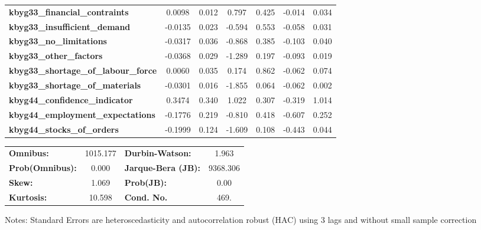 \begin{center}
\begin{tabular}{lcccccc}
\textbf{kbyg33\_financial\_contraints}       &       0.0098  &        0.012     &     0.797  &         0.425        &       -0.014    &        0.034     \\
\textbf{kbyg33\_insufficient\_demand}        &      -0.0135  &        0.023     &    -0.594  &         0.553        &       -0.058    &        0.031     \\
\textbf{kbyg33\_no\_limitations}             &      -0.0317  &        0.036     &    -0.868  &         0.385        &       -0.103    &        0.040     \\
\textbf{kbyg33\_other\_factors}              &      -0.0368  &        0.029     &    -1.289  &         0.197        &       -0.093    &        0.019     \\
\textbf{kbyg33\_shortage\_of\_labour\_force} &       0.0060  &        0.035     &     0.174  &         0.862        &       -0.062    &        0.074     \\
\textbf{kbyg33\_shortage\_of\_materials}     &      -0.0301  &        0.016     &    -1.855  &         0.064        &       -0.062    &        0.002     \\
\textbf{kbyg44\_confidence\_indicator}       &       0.3474  &        0.340     &     1.022  &         0.307        &       -0.319    &        1.014     \\
\textbf{kbyg44\_employment\_expectations}    &      -0.1776  &        0.219     &    -0.810  &         0.418        &       -0.607    &        0.252     \\
\textbf{kbyg44\_stocks\_of\_orders}          &      -0.1999  &        0.124     &    -1.609  &         0.108        &       -0.443    &        0.044     \\
\bottomrule
\end{tabular}
\begin{tabular}{lclc}
\textbf{Omnibus:}       & 1015.177 & \textbf{  Durbin-Watson:     } &    1.963  \\
\textbf{Prob(Omnibus):} &   0.000  & \textbf{  Jarque-Bera (JB):  } & 9368.306  \\
\textbf{Skew:}          &   1.069  & \textbf{  Prob(JB):          } &     0.00  \\
\textbf{Kurtosis:}      &  10.598  & \textbf{  Cond. No.          } &     469.  \\
\bottomrule
\end{tabular}
\end{center}

Notes: \newline
 [1] Standard Errors are heteroscedasticity and autocorrelation robust (HAC) using 3 lags and without small sample correction